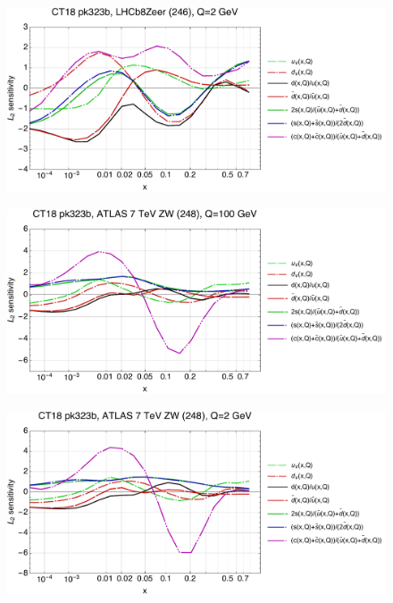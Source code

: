 \documentclass[10pt,aps,prd,floatfix,titlepage]{revtex4}
\begin{document}
\begin{figure}
\includegraphics[width=\textwidth,height=0.44\textheight,keepaspectratio]{2/246_ct18nn_q2_Sf_2.pdf}
\caption{}
\end{figure}
\clearpage
\begin{figure}
\includegraphics[width=\textwidth,height=0.44\textheight,keepaspectratio]{2/248_ct18nn_q100_Sf_2.pdf}
\caption{}
\end{figure}
\begin{figure}
\includegraphics[width=\textwidth,height=0.44\textheight,keepaspectratio]{2/248_ct18nn_q2_Sf_2.pdf}
\caption{}
\end{figure}
\end{document}
